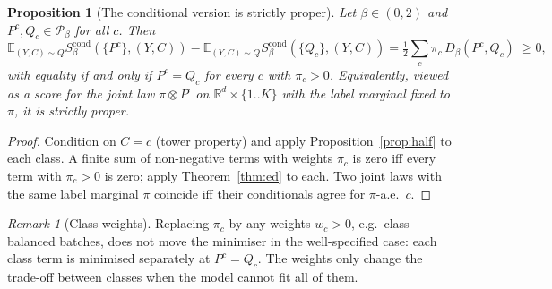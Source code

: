 \documentclass[11pt]{article}
\newtheorem{proposition}[theorem]{Proposition}
\theoremstyle{definition}
\theoremstyle{remark}
\newtheorem{remark}[theorem]{Remark}
\newcommand{\R}{\mathbb{R}}
\newcommand{\E}{\mathbb{E}}
\newcommand{\Pb}{\mathcal{P}}
\newcommand{\Db}{D_\beta}
\begin{document}
\begin{proposition}[The conditional version is strictly proper]\label{prop:cond}
Let $\beta\in(0,2)$ and $P^c,Q_c\in\Pb_\beta$ for all $c$. Then
\[
\E_{(Y,C)\sim Q}S^{\mathrm{cond}}_\beta(\{P^c\},(Y,C))-\E_{(Y,C)\sim Q}S^{\mathrm{cond}}_\beta(\{Q_c\},(Y,C))
=\tfrac12\sum_c\pi_c\,\Db(P^c,Q_c)\;\ge0,
\]
with equality if and only if $P^c=Q_c$ for every $c$ with $\pi_c>0$. Equivalently, viewed as a score for the
joint law $\pi\otimes P^{\cdot}$ on $\R^d\times\{1..K\}$ with the label marginal fixed to $\pi$, it is
strictly proper.
\end{proposition}
\begin{proof}
Condition on $C=c$ (tower property) and apply Proposition~\ref{prop:half} to each class. A finite sum of
non-negative terms with weights $\pi_c$ is zero iff every term with $\pi_c>0$ is zero; apply
Theorem~\ref{thm:ed} to each. Two joint laws with the same label marginal $\pi$ coincide iff their
conditionals agree for $\pi$-a.e.\ $c$.
\end{proof}
\begin{remark}[Class weights]\label{rem:weights}
Replacing $\pi_c$ by any weights $w_c>0$, e.g.\ class-balanced batches, does not move the minimiser in the
well-specified case: each class term is minimised separately at $P^c=Q_c$. The weights only change the
trade-off between classes when the model cannot fit all of them.
\end{remark}
\end{document}

